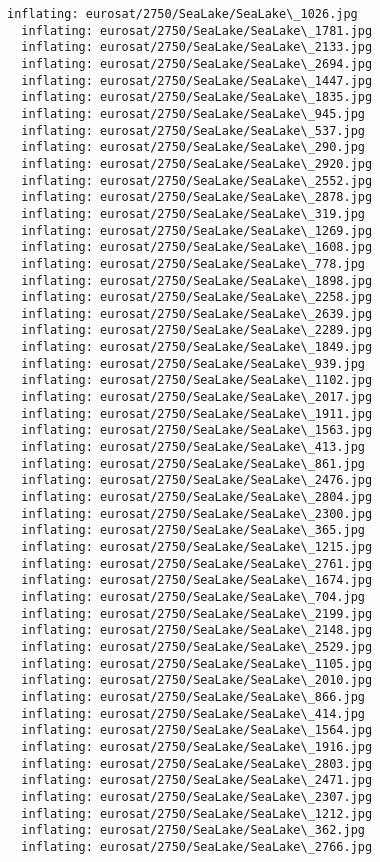 \documentclass[11pt]{article}
\begin{document}
\begin{Verbatim}[commandchars=\\\{\}]
  inflating: eurosat/2750/SeaLake/SeaLake\_1026.jpg
  inflating: eurosat/2750/SeaLake/SeaLake\_1781.jpg
  inflating: eurosat/2750/SeaLake/SeaLake\_2133.jpg
  inflating: eurosat/2750/SeaLake/SeaLake\_2694.jpg
  inflating: eurosat/2750/SeaLake/SeaLake\_1447.jpg
  inflating: eurosat/2750/SeaLake/SeaLake\_1835.jpg
  inflating: eurosat/2750/SeaLake/SeaLake\_945.jpg
  inflating: eurosat/2750/SeaLake/SeaLake\_537.jpg
  inflating: eurosat/2750/SeaLake/SeaLake\_290.jpg
  inflating: eurosat/2750/SeaLake/SeaLake\_2920.jpg
  inflating: eurosat/2750/SeaLake/SeaLake\_2552.jpg
  inflating: eurosat/2750/SeaLake/SeaLake\_2878.jpg
  inflating: eurosat/2750/SeaLake/SeaLake\_319.jpg
  inflating: eurosat/2750/SeaLake/SeaLake\_1269.jpg
  inflating: eurosat/2750/SeaLake/SeaLake\_1608.jpg
  inflating: eurosat/2750/SeaLake/SeaLake\_778.jpg
  inflating: eurosat/2750/SeaLake/SeaLake\_1898.jpg
  inflating: eurosat/2750/SeaLake/SeaLake\_2258.jpg
  inflating: eurosat/2750/SeaLake/SeaLake\_2639.jpg
  inflating: eurosat/2750/SeaLake/SeaLake\_2289.jpg
  inflating: eurosat/2750/SeaLake/SeaLake\_1849.jpg
  inflating: eurosat/2750/SeaLake/SeaLake\_939.jpg
  inflating: eurosat/2750/SeaLake/SeaLake\_1102.jpg
  inflating: eurosat/2750/SeaLake/SeaLake\_2017.jpg
  inflating: eurosat/2750/SeaLake/SeaLake\_1911.jpg
  inflating: eurosat/2750/SeaLake/SeaLake\_1563.jpg
  inflating: eurosat/2750/SeaLake/SeaLake\_413.jpg
  inflating: eurosat/2750/SeaLake/SeaLake\_861.jpg
  inflating: eurosat/2750/SeaLake/SeaLake\_2476.jpg
  inflating: eurosat/2750/SeaLake/SeaLake\_2804.jpg
  inflating: eurosat/2750/SeaLake/SeaLake\_2300.jpg
  inflating: eurosat/2750/SeaLake/SeaLake\_365.jpg
  inflating: eurosat/2750/SeaLake/SeaLake\_1215.jpg
  inflating: eurosat/2750/SeaLake/SeaLake\_2761.jpg
  inflating: eurosat/2750/SeaLake/SeaLake\_1674.jpg
  inflating: eurosat/2750/SeaLake/SeaLake\_704.jpg
  inflating: eurosat/2750/SeaLake/SeaLake\_2199.jpg
  inflating: eurosat/2750/SeaLake/SeaLake\_2148.jpg
  inflating: eurosat/2750/SeaLake/SeaLake\_2529.jpg
  inflating: eurosat/2750/SeaLake/SeaLake\_1105.jpg
  inflating: eurosat/2750/SeaLake/SeaLake\_2010.jpg
  inflating: eurosat/2750/SeaLake/SeaLake\_866.jpg
  inflating: eurosat/2750/SeaLake/SeaLake\_414.jpg
  inflating: eurosat/2750/SeaLake/SeaLake\_1564.jpg
  inflating: eurosat/2750/SeaLake/SeaLake\_1916.jpg
  inflating: eurosat/2750/SeaLake/SeaLake\_2803.jpg
  inflating: eurosat/2750/SeaLake/SeaLake\_2471.jpg
  inflating: eurosat/2750/SeaLake/SeaLake\_2307.jpg
  inflating: eurosat/2750/SeaLake/SeaLake\_1212.jpg
  inflating: eurosat/2750/SeaLake/SeaLake\_362.jpg
  inflating: eurosat/2750/SeaLake/SeaLake\_2766.jpg

\end{Verbatim}
\end{document}
